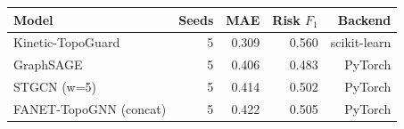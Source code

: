 \begin{tabular}{lrrrr}
\toprule
Model & Seeds & MAE & Risk $F_1$ & Backend \\
\midrule
Kinetic-TopoGuard & 5 & 0.309 & 0.560 & scikit-learn \\
GraphSAGE & 5 & 0.406 & 0.483 & PyTorch \\
STGCN (w=5) & 5 & 0.414 & 0.502 & PyTorch \\
FANET-TopoGNN (concat) & 5 & 0.422 & 0.505 & PyTorch \\
\bottomrule
\end{tabular}
